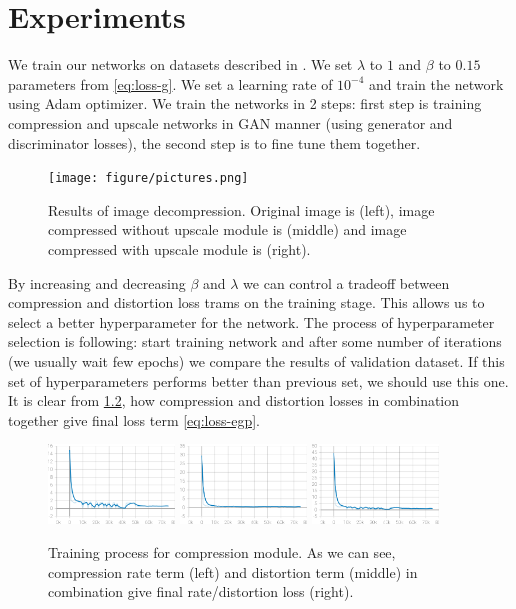 \chapter{Experiments}

We train our networks on datasets described in . We set $\lambda$ to $1$ and $\beta$ to $0.15$ parameters from \ref{eq:loss-g}. We set a learning rate of $10^{-4}$ and train the network using Adam optimizer. We train the networks in 2 steps: first step is training compression and upscale networks in GAN manner (using generator and discriminator losses), the second step is to fine tune them together.

\begin{figure}[!ht]
    \centering
    \texttt{[image: figure/pictures.png]}
    \caption{Results of image decompression. Original image is (left), image compressed without upscale module is (middle) and image compressed with upscale module is (right).}
    \label{road}
\end{figure}

By increasing and decreasing $\beta$ and $\lambda$ we can control a tradeoff between compression and distortion loss trams on the training stage. This allows us to select a better hyperparameter for the network. The process of hyperparameter selection is following: start training network and after some number of iterations (we usually wait few epochs) we compare the results of validation dataset. If this set of hyperparameters performs better than previous set, we should use this one. It is clear from \ref{compession-losses}, how compression and distortion losses in combination together give final loss term \ref{eq:loss-egp}.

\begin{figure}[!ht]
    \centering
    \includegraphics[width=0.3\textwidth]{figure/weighted_compression_weighted_rate.png}
    \includegraphics[width=0.3\textwidth]{figure/weighted_compression_weighted_distortion.png}
    \includegraphics[width=0.3\textwidth]{figure/weighted_compression_weighted_R_D.png}
    \caption{Training process for compression module. As we can see, compression rate term (left) and distortion term (middle) in combination give final rate/distortion loss (right).}
    \label{compession-losses}
\end{figure}

